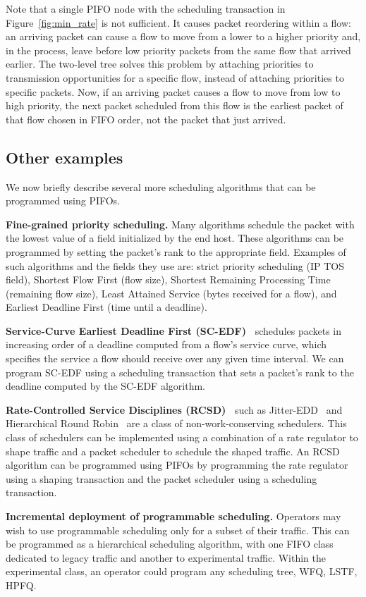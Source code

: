 Note that a single PIFO node with the scheduling transaction in
Figure~\ref{fig:min_rate} is not sufficient. It causes packet reordering within
a flow: an arriving packet can cause a flow to move from a lower to a higher
priority and, in the process, leave before low priority packets from the same
flow that arrived earlier. The two-level tree solves this problem by attaching
priorities to transmission opportunities for a specific flow, instead of
attaching priorities to specific packets. Now, if an arriving packet causes a
flow to move from low to high priority, the next packet scheduled from this
flow is the earliest packet of that flow chosen in FIFO order, not the packet
that just arrived.

\subsection{Other examples}
\label{ss:other}

We now briefly describe several more scheduling algorithms that can be
programmed using PIFOs.

\begin{CompactEnumerate}
\item \textbf{Fine-grained priority scheduling.} Many algorithms schedule the
packet with the lowest value of a field initialized by the end host. These
algorithms can be programmed by setting the packet's rank to the appropriate
field. Examples of such algorithms and the fields they use are: strict priority
scheduling (IP TOS field), Shortest Flow First (flow size), Shortest Remaining
Processing Time (remaining flow size), Least Attained Service (bytes received
for a flow), and Earliest Deadline First (time until a deadline).
\item \textbf{Service-Curve Earliest Deadline First
    (SC-EDF)~\cite{sced}} schedules packets in increasing order of a
  deadline computed from a flow's service curve, which specifies the
  service a flow should receive over any given time interval. We can
  program SC-EDF using a scheduling transaction that sets a packet's
  rank to the deadline computed by the SC-EDF algorithm.
\item \textbf{Rate-Controlled Service Disciplines (RCSD)~\cite{rcsd}}
  such as Jitter-EDD~\cite{jitteredd} and Hierarchical Round
  Robin~\cite{hrr} are a class of non-work-conserving schedulers. This
  class of schedulers can be implemented using a combination of a rate
  regulator to shape traffic and a packet scheduler to schedule the
  shaped traffic. An RCSD algorithm can be programmed using PIFOs by
  programming the rate regulator using a shaping transaction and the
  packet scheduler using a scheduling transaction.
  
\item \textbf{Incremental deployment of programmable scheduling.}
  Operators may wish to use programmable scheduling only for a
  subset of their traffic. This can be programmed as a hierarchical
  scheduling algorithm, with one FIFO class dedicated to legacy
  traffic and another to experimental traffic. Within the experimental
  class, an operator could program any scheduling tree, \eg WFQ, LSTF, HPFQ.
\end{CompactEnumerate}

